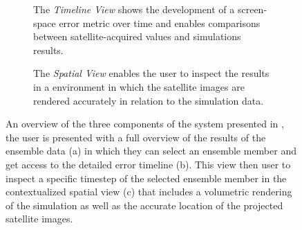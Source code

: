 \begin{landscape}
\begin{figure}
\begin{subfigure}[b]{0.4\textwidth}
    \caption{The \emph{Timeline View} shows the development of a screen-space error metric over time and enables comparisons between satellite-acquired values and simulations results.}
    \label{contributions:astro:spaceweather:system:timeline}
\end{subfigure}
\hfill
\begin{subfigure}[b]{0.4\textwidth}
   \caption{The \emph{Spatial View} enables the user to inspect the results in a  environment in which the satellite images are rendered accurately in relation to the simulation data.}
   \label{contributions:astro:spaceweather:system:rendering}
\end{subfigure}
\caption{An overview of the three components of the system presented in , the user is presented with a full overview of the results of the ensemble data (a) in which they can select an ensemble member and get access to the detailed error timeline (b).  This view then user to inspect a specific timestep of the selected ensemble member in the contextualized spatial view (c) that includes a volumetric rendering of the simulation as well as the accurate location of the projected satellite images.}
\label{contributions:astro:spaceweather:system}
\end{figure}
\end{landscape}



